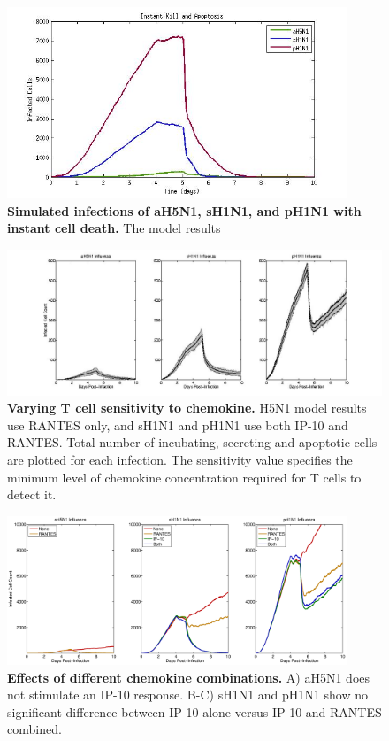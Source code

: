 \documentclass[10pt]{article}
\begin{document}
\begin{figure}[!ht]
\begin{center}
\includegraphics[width=4in]{Figure_7}
 \end{center}
\caption{{\bf Simulated infections of aH5N1, sH1N1, and pH1N1 with instant cell death.} The model results }
 \label{fig:instantkill}
\end{figure}

\setcounter{figure}{0}
\renewcommand{\thefigure}{S\arabic{figure}}

\begin{figure}[ht!]
\begin{center}
\includegraphics[width=\textwidth]{Figure_S1}
 \end{center}
\caption{{\bf Varying T cell sensitivity to chemokine.}  H5N1 model results use RANTES  only, and sH1N1 and pH1N1 use both IP-10 and RANTES. Total number of incubating, secreting and apoptotic cells are plotted for each infection.  The sensitivity value specifies the minimum level of chemokine concentration required for T cells to detect it.} 
\end{figure}


\begin{figure}[!ht]
\begin{center}
\includegraphics[width=4in]{Figure_S2}
 \end{center}
\caption{\textbf{Effects of different chemokine combinations.}  A) aH5N1 does not stimulate an IP-10 response.  B-C) sH1N1 and pH1N1 show no significant difference between IP-10 alone versus IP-10 and RANTES combined.} 
 \label{fig:sensitivity}
\end{figure}
\end{document}
